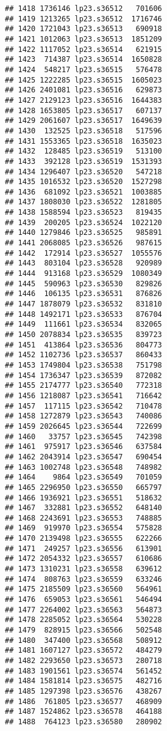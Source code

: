 \documentclass[
]{article}
\begin{document}
\begin{verbatim}
## 1418 1736146 lp23.s36512   701606
## 1419 1213265 lp23.s36512  1716746
## 1420 1721043 lp23.s36513   690918
## 1421 1012063 lp23.s36513  1851209
## 1422 1117052 lp23.s36514   621915
## 1423  714387 lp23.s36514  1650828
## 1424  548217 lp23.s36515   576478
## 1425 1222285 lp23.s36515  1605023
## 1426 2401081 lp23.s36516   629873
## 1427 2129123 lp23.s36516  1644383
## 1428 1653805 lp23.s36517   607137
## 1429 2061607 lp23.s36517  1649639
## 1430  132525 lp23.s36518   517596
## 1431 1553365 lp23.s36518  1635023
## 1432  128485 lp23.s36519   513100
## 1433  392128 lp23.s36519  1531393
## 1434 1296407 lp23.s36520   547218
## 1435 1016532 lp23.s36520  1527298
## 1436  681092 lp23.s36521  1003885
## 1437 1808030 lp23.s36522  1281805
## 1438 1588594 lp23.s36523   819435
## 1439  200205 lp23.s36524  1022120
## 1440 1279846 lp23.s36525   985891
## 1441 2068085 lp23.s36526   987615
## 1442  172914 lp23.s36527  1055576
## 1443  803104 lp23.s36528   920989
## 1444  913168 lp23.s36529  1080349
## 1445  590963 lp23.s36530   829826
## 1446  106135 lp23.s36531   876826
## 1447 1878079 lp23.s36532   831810
## 1448 1492171 lp23.s36533   876704
## 1449  111661 lp23.s36534   832065
## 1450 2078834 lp23.s36535   839723
## 1451  413864 lp23.s36536   804773
## 1452 1102736 lp23.s36537   860433
## 1453 1749804 lp23.s36538   751798
## 1454 1736347 lp23.s36539   872082
## 1455 2174777 lp23.s36540   772318
## 1456 1218087 lp23.s36541   716642
## 1457  117115 lp23.s36542   710478
## 1458 1272879 lp23.s36543   740086
## 1459 2026645 lp23.s36544   722699
## 1460   33757 lp23.s36545   742398
## 1461  975917 lp23.s36546   637584
## 1462 2043914 lp23.s36547   690454
## 1463 1002748 lp23.s36548   748982
## 1464    9864 lp23.s36549   701059
## 1465 2296950 lp23.s36550   665797
## 1466 1936921 lp23.s36551   518632
## 1467  332881 lp23.s36552   648140
## 1468 2243691 lp23.s36553   748885
## 1469  919970 lp23.s36554   575828
## 1470 2139498 lp23.s36555   622266
## 1471  249257 lp23.s36556   613901
## 1472 2054332 lp23.s36557   610686
## 1473 1310231 lp23.s36558   639612
## 1474  808763 lp23.s36559   633246
## 1475 2185509 lp23.s36560   564961
## 1476  659053 lp23.s36561   546494
## 1477 2264002 lp23.s36563   564873
## 1478 2285052 lp23.s36564   530228
## 1479  828915 lp23.s36566   502548
## 1480  347400 lp23.s36568   508912
## 1481 1607127 lp23.s36572   484279
## 1482 2293650 lp23.s36573   280718
## 1483 1901561 lp23.s36574   561452
## 1484 1581814 lp23.s36575   482716
## 1485 1297398 lp23.s36576   438267
## 1486  761805 lp23.s36577   468909
## 1487 1524862 lp23.s36578   464188
## 1488  764123 lp23.s36580   280902

\end{verbatim}
\end{document}
